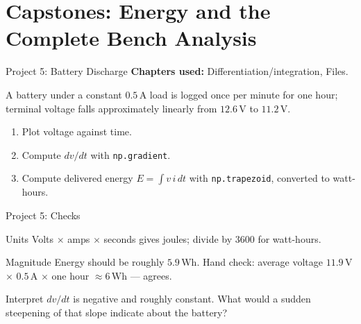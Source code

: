 \documentclass[9pt,aspectratio=169,xcolor=table]{beamer}
\begin{document}
\section{Capstones: Energy and the Complete Bench Analysis}

\begin{frame}{Project 5: Battery Discharge}
    \leavevmode
    \textbf{Chapters used:} Differentiation/integration, Files.

    \vspace{2mm}
    A battery under a constant $0.5\,\text{A}$ load is logged once per
    minute for one hour; terminal voltage falls approximately linearly
    from $12.6\,\text{V}$ to $11.2\,\text{V}$.

    \vspace{2mm}
    \begin{enumerate}
        \item Plot voltage against time.
        \item Compute $dv/dt$ with \texttt{np.gradient}.
        \item Compute delivered energy $E = \int v\,i\,dt$ with
              \texttt{np.trapezoid}, converted to watt-hours.
    \end{enumerate}
\end{frame}

\begin{frame}{Project 5: Checks}
    \leavevmode
    \begin{block}{Units}
        Volts $\times$ amps $\times$ seconds gives joules; divide by
        $3600$ for watt-hours.
    \end{block}

    \vspace{2mm}
    \begin{block}{Magnitude}
        Energy should be roughly $5.9\,\text{Wh}$. Hand check: average
        voltage $11.9\,\text{V}$ $\times$ $0.5\,\text{A}$ $\times$ one
        hour $\approx 6\,\text{Wh}$ --- agrees.
    \end{block}

    \vspace{2mm}
    \begin{alertblock}{Interpret}
        $dv/dt$ is negative and roughly constant. What would a sudden
        \alert{steepening} of that slope indicate about the battery?
    \end{alertblock}
\end{frame}
\end{document}
